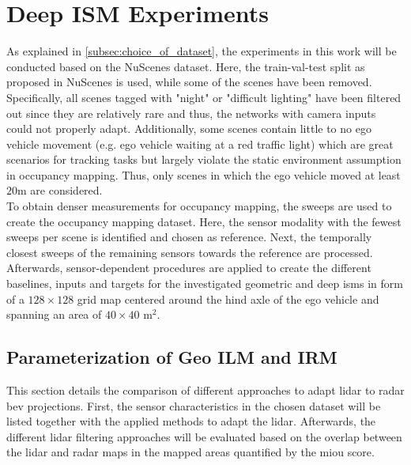 \chapter{Deep ISM Experiments}
\label{ch:deep_ism_exp}
As explained in \ref{subsec:choice_of_dataset}, the experiments in this work will be conducted based on the NuScenes dataset. Here, the train-val-test split as proposed in NuScenes is used, while some of the scenes have been removed. Specifically, all scenes tagged with "night" or "difficult lighting" have been filtered out since they are relatively rare and thus, the networks with camera inputs could not properly adapt. Additionally, some scenes contain little to no ego vehicle movement (e.g. ego vehicle waiting at a red traffic light) which are great scenarios for tracking tasks but largely violate the static environment assumption in occupancy mapping. Thus, only scenes in which the ego vehicle moved at least $20$m are considered.
\\
To obtain denser measurements for occupancy mapping, the sweeps are used to create the occupancy mapping dataset. Here, the sensor modality with the fewest sweeps per scene is identified and chosen as reference. Next, the temporally closest sweeps of the remaining sensors towards the reference are processed. Afterwards, sensor-dependent procedures are applied to create the different baselines, inputs and targets for the investigated geometric and deep \gls{ism}s in form of a $128\times 128$ grid map centered around the hind axle of the ego vehicle and spanning an area of $40 \times 40$ m$^2$.
%
\section{Parameterization of Geo ILM and IRM}
\label{sec:choice_of_gt}
This section details the comparison of different approaches to adapt lidar to radar \gls{bev} projections. First, the sensor characteristics in the chosen dataset will be listed together with the applied methods to adapt the lidar. Afterwards, the different lidar filtering approaches will be evaluated based on the overlap between the lidar and radar maps in the mapped areas quantified by the m\gls{iou} score. 
%
